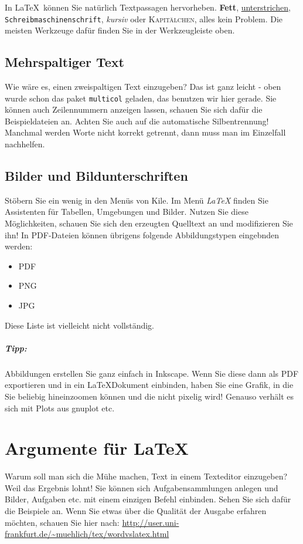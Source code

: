 \documentclass{scrartcl}
\begin{document}
In \LaTeX\ können Sie natürlich Textpassagen hervorheben. \textbf{Fett}, \underline{unterstrichen}, \texttt{Schreib\-ma\-schi\-nen\-schrift}, \textit{kursiv} oder \textsc{Kapitälchen}, alles kein Problem. Die meisten Werkzeuge dafür finden Sie in der Werkzeugleiste oben.
\subsection{Mehrspaltiger Text}
\begin{multicols}{2}
Wie wäre es, einen zweispaltigen Text einzugeben? Das ist ganz leicht - oben wurde schon das paket \texttt{multicol} geladen, das benutzen wir hier gerade. Sie können auch Zeilennummern anzeigen lassen, schauen Sie sich dafür die Beispieldateien an. Achten Sie auch auf die automatische Silbentrennung! Manchmal werden Worte nicht korrekt getrennt, dann muss man im Einzelfall nachhelfen.
\end{multicols}

\subsection{Bilder und Bildunterschriften}
Stöbern Sie ein wenig in den Menüs von Kile. Im Menü \emph{LaTeX} finden Sie Assistenten für Tabellen, Umgebungen und Bilder. Nutzen Sie diese Möglichkeiten, schauen Sie sich den erzeugten Quelltext an und modifizieren Sie ihn! In PDF-Dateien können übrigens folgende Abbildungstypen eingebnden werden:
\begin{itemize}
	\item PDF
	\item PNG
	\item JPG
\end{itemize}
Diese Liste ist vielleicht nicht vollständig. 

\subparagraph{Tipp:} Abbildungen erstellen Sie ganz einfach in Inkscape. Wenn Sie diese dann als PDF exportieren und in ein \LaTeX\-Dokument einbinden, haben Sie eine Grafik, in die Sie beliebig hineinzoomen können und die nicht pixelig wird! Genauso verhält es sich mit Plots aus gnuplot etc.


\section{Argumente für \LaTeX}
Warum soll man sich die Mühe machen, Text in einem Texteditor einzugeben? Weil das Ergebnis lohnt! Sie können sich Aufgabensammlungen anlegen und Bilder, Aufgaben etc. mit einem einzigen Befehl einbinden. Sehen Sie sich dafür die Beispiele an. Wenn Sie etwas über die Qualität der Ausgabe erfahren möchten, schauen Sie hier nach: \url{http://user.uni-frankfurt.de/~muehlich/tex/wordvslatex.html}

\end{document}
